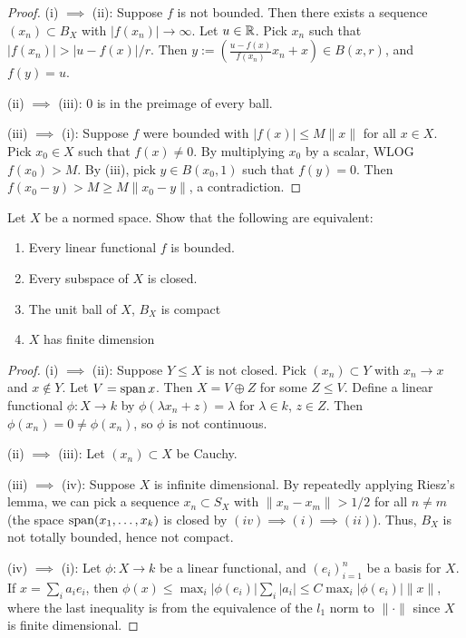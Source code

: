 \documentclass{article}
\begin{document}
\begin{proof}
(i) $\implies$ (ii): Suppose $f$ is not bounded. Then there exists a sequence $(x_n) \subset B_X$ with $|f(x_n)| \to \infty$.  Let $u \in \mathbb{R}$.  Pick $x_n$ such that $|f(x_n)| > |u - f(x)|/r$.  Then $y := (\frac{u - f(x)}{f(x_n)} x_n + x) \in B(x,r)$, and $f(y) = u$.

(ii) $\implies$ (iii):  $0$ is in the preimage of every ball.

(iii) $\implies$ (i): Suppose $f$ were bounded with $|f(x)| \le M \|x\|$ for all $x \in X$.  Pick $x_0 \in X$ such that $f(x) \neq 0$. By multiplying $x_0$ by a scalar, WLOG $f(x_0) > M$.  By (iii), pick $y \in B(x_0, 1)$ such that $f(y) = 0$.  Then $f(x_0 - y) > M \ge M \|x_0 - y\|$, a contradiction.
\end{proof}


 Let $X$ be a normed space. Show that the following are equivalent:
\begin{enumerate}
\item Every linear functional $f$ is bounded.
\item Every subspace of $X$ is closed.
\item The unit ball of $X$, $B_X$ is compact
\item $X$ has finite dimension
\end{enumerate}

\begin{proof}
(i) $\implies$ (ii):  Suppose $Y \le X$ is not closed. Pick $(x_n) \subset Y$ with $x_n \to x$ and $x \not\in Y$. Let $V = \operatorname{span}{x}$. Then $X = V \oplus Z$ for some $Z \le V$.  Define a linear functional $\phi: X \to k$ by $\phi(\lambda x_n + z) = \lambda$ for $\lambda \in k$, $z \in Z$.   Then $\phi(x_n) = 0 \neq \phi(x_n)$, so $\phi$ is not continuous.

(ii) $\implies$ (iii): Let $(x_n) \subset X$ be Cauchy.  %

(iii) $\implies$ (iv):  Suppose $X$ is infinite dimensional. By repeatedly applying Riesz's lemma, we can pick a sequence $x_n \subset S_X$ with $\|x_n - x_m\| > 1/2$ for all $n \neq m$  (the space $\operatorname{span}(x_1, \ldots, x_k)$ is closed by $(iv) \implies (i) \implies (ii)$). Thus, $B_X$ is not totally bounded, hence not compact.

(iv) $\implies$ (i): Let $\phi: X \to k$ be a linear functional, and $(e_i)_{i=1}^n$ be a basis for $X$.  If $x = \sum_i a_i e_i$, then $\phi(x) \le \max_i |\phi(e_i)| \sum_i |a_i| \le C \max_i |\phi(e_i)|  \|x\|$, where the last inequality is from the equivalence of the $l_1$ norm to $\| \cdot \|$ since $X$ is finite dimensional.
\end{proof}
\end{document}
